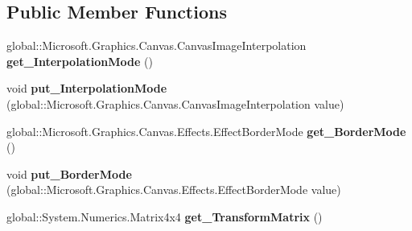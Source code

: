 \subsection*{Public Member Functions}
\begin{DoxyCompactItemize}
\item 
\mbox{\label{interface_microsoft_1_1_graphics_1_1_canvas_1_1_effects_1_1_i_transform3_d_effect_aefc252bdfd3579f343b3a345dba1a4f3}} 
global\+::\+Microsoft.\+Graphics.\+Canvas.\+Canvas\+Image\+Interpolation {\bfseries get\+\_\+\+Interpolation\+Mode} ()
\item 
\mbox{\label{interface_microsoft_1_1_graphics_1_1_canvas_1_1_effects_1_1_i_transform3_d_effect_a8ccce526ac8bfcfef799e807637ad92b}} 
void {\bfseries put\+\_\+\+Interpolation\+Mode} (global\+::\+Microsoft.\+Graphics.\+Canvas.\+Canvas\+Image\+Interpolation value)
\item 
\mbox{\label{interface_microsoft_1_1_graphics_1_1_canvas_1_1_effects_1_1_i_transform3_d_effect_a6e3886f8c1a115e3734fb2df7df7fc38}} 
global\+::\+Microsoft.\+Graphics.\+Canvas.\+Effects.\+Effect\+Border\+Mode {\bfseries get\+\_\+\+Border\+Mode} ()
\item 
\mbox{\label{interface_microsoft_1_1_graphics_1_1_canvas_1_1_effects_1_1_i_transform3_d_effect_a25a24175bd4b6592a9795eee3b7b7566}} 
void {\bfseries put\+\_\+\+Border\+Mode} (global\+::\+Microsoft.\+Graphics.\+Canvas.\+Effects.\+Effect\+Border\+Mode value)
\item 
\mbox{\label{interface_microsoft_1_1_graphics_1_1_canvas_1_1_effects_1_1_i_transform3_d_effect_a2bbd145f06ce7bf83aa605e71a35418b}} 
global\+::\+System.\+Numerics.\+Matrix4x4 {\bfseries get\+\_\+\+Transform\+Matrix} ()
\item 
\mbox{\label{interface_microsoft_1_1_graphics_1_1_canvas_1_1_effects_1_1_i_transform3_d_effect_a60689b755d5b8543e291b86faa19538b}} 

\end{DoxyCompactItemize}
